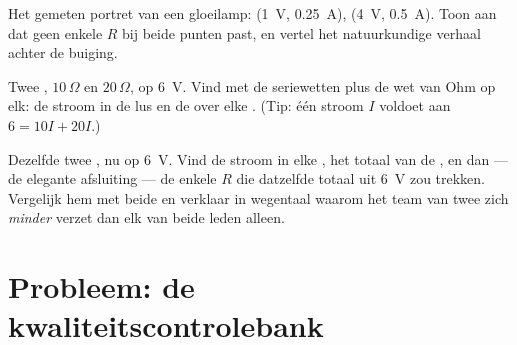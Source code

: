\begin{exercise}[$\star\star$]\label{exo:g8:ohms-law:10}
Het gemeten portret van een gloeilamp: (\qty{1}{V}, \qty{0.25}{A}),
(\qty{4}{V}, \qty{0.5}{A}). Toon aan dat geen enkele $R$ bij beide
punten past, en vertel het natuurkundige verhaal achter de buiging.
\end{exercise}

\begin{exercise}[$\star\star$]\label{exo:g8:ohms-law:11}
Twee  , $10\,\Omega$ en
$20\,\Omega$, op \qty{6}{V}. Vind met de seriewetten plus de wet van
Ohm op elk: de stroom in de lus en de  over elke
. (Tip: één stroom $I$ voldoet aan $6 = 10 I + 20
I$.)
\end{exercise}

\begin{exercise}[$\star\star\star$]\label{exo:g8:ohms-law:12}
Dezelfde twee , nu  op
\qty{6}{V}. Vind de stroom in elke , het totaal van de
, en dan --- de elegante afsluiting --- de enkele
 $R$ die datzelfde totaal uit \qty{6}{V} zou
trekken. Vergelijk hem met beide  en verklaar in
wegentaal waarom het team van twee zich \emph{minder} verzet dan elk
van beide leden alleen.
\end{exercise}

\section{Probleem: de kwaliteitscontrolebank}

